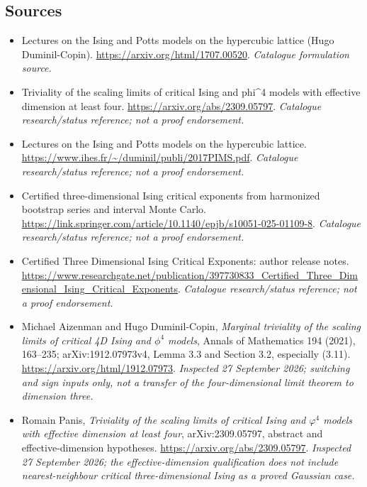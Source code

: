 \documentclass[11pt,a4paper]{article}
\numberwithin{equation}{section}
\begin{document}
\subsection{Sources}
\begin{itemize}\raggedright
\item[\textnormal{[S1]}]\hypertarget{source:30006710:1}{} Lectures on the Ising and Potts models on the hypercubic lattice (Hugo Duminil-Copin).
\url{https://arxiv.org/html/1707.00520}.
{\small\textit{Catalogue formulation source.}}
\item[\textnormal{[S2]}]\hypertarget{source:30006710:2}{} Triviality of the scaling limits of critical Ising and phi\textasciicircum{}4 models with effective dimension at least four.
\url{https://arxiv.org/abs/2309.05797}.
{\small\textit{Catalogue research/status reference; not a proof endorsement.}}
\item[\textnormal{[S3]}]\hypertarget{source:30006710:3}{} Lectures on the Ising and Potts models on the hypercubic lattice.
\url{https://www.ihes.fr/~/duminil/publi/2017PIMS.pdf}.
{\small\textit{Catalogue research/status reference; not a proof endorsement.}}
\item[\textnormal{[S4]}]\hypertarget{source:30006710:4}{} Certified three-dimensional Ising critical exponents from harmonized bootstrap series and interval Monte Carlo.
\url{https://link.springer.com/article/10.1140/epjb/s10051-025-01109-8}.
{\small\textit{Catalogue research/status reference; not a proof endorsement.}}
\item[\textnormal{[S5]}]\hypertarget{source:30006710:5}{} Certified Three Dimensional Ising Critical Exponents: author release notes.
\url{https://www.researchgate.net/publication/397730833_Certified_Three_Dimensional_Ising_Critical_Exponents}.
{\small\textit{Catalogue research/status reference; not a proof endorsement.}}
\item[\textnormal{[E1]}]\hypertarget{extra:30006710:1}{} Michael Aizenman and
Hugo Duminil-Copin, \emph{Marginal triviality of the scaling limits of
critical 4D Ising and $\phi^4$ models}, Annals of Mathematics 194 (2021),
163--235; arXiv:1912.07973v4, Lemma 3.3 and Section 3.2, especially (3.11).
\url{https://arxiv.org/html/1912.07973}.
{\small\textit{Inspected 27 September 2026; switching and sign inputs only,
not a transfer of the four-dimensional limit theorem to dimension three.}}
\item[\textnormal{[E2]}]\hypertarget{extra:30006710:2}{} Romain Panis,
\emph{Triviality of the scaling limits of critical Ising and $\varphi^4$
models with effective dimension at least four}, arXiv:2309.05797,
abstract and effective-dimension hypotheses.
\url{https://arxiv.org/abs/2309.05797}.
{\small\textit{Inspected 27 September 2026; the effective-dimension
qualification does not include nearest-neighbour critical three-dimensional
Ising as a proved Gaussian case.}}
\end{itemize}
\end{document}
